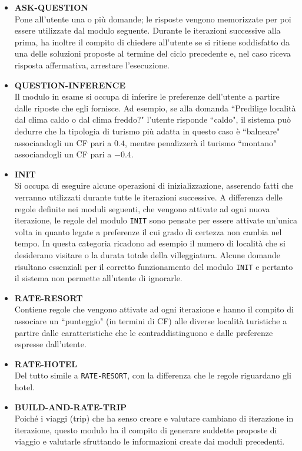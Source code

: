\begin{itemize}
\item \textbf{ASK-QUESTION}\\
Pone all'utente una o più domande; le risposte vengono memorizzate per poi essere utilizzate dal modulo seguente.  Durante le iterazioni successive alla prima, ha inoltre il compito di chiedere all'utente se si ritiene soddisfatto da una delle soluzioni proposte al termine del ciclo precedente e, nel caso riceva risposta affermativa, arrestare l'esecuzione.
\item \textbf{QUESTION-INFERENCE}\\
Il modulo in esame si occupa di inferire le preferenze dell'utente a partire dalle riposte che egli fornisce. Ad esempio, se alla domanda ``Predilige località dal clima caldo o dal clima freddo?" l'utente risponde ``caldo", il sistema può dedurre che la tipologia di turismo più adatta in questo caso è ``balneare" associandogli un CF pari a $0.4$, mentre penalizzerà il turismo ``montano" associandogli un CF pari a $-0.4$.
\item \textbf{INIT}\\
Si occupa di eseguire alcune operazioni di inizializzazione, asserendo fatti che verranno utilizzati durante tutte le iterazioni successive. A differenza delle regole definite nei moduli seguenti, che vengono attivate ad ogni nuova iterazione, le regole del modulo \texttt{INIT} sono pensate per essere attivate un'unica volta in quanto legate a preferenze il cui grado di certezza non cambia nel tempo. In questa categoria ricadono ad esempio il numero di località che si desiderano visitare o la durata totale della villeggiatura. Alcune domande risultano essenziali per il corretto funzionamento del modulo \texttt{INIT} e pertanto il sistema non permette all'utente di ignorarle. 
\item \textbf{RATE-RESORT}\\
Contiene regole che vengono attivate ad ogni iterazione e hanno il compito di associare un ``punteggio" (in termini di CF) alle diverse località turistiche a partire dalle caratteristiche che le contraddistinguono e dalle preferenze espresse dall'utente.
\item \textbf{RATE-HOTEL}\\
Del tutto simile a \texttt{RATE-RESORT}, con la differenza che le regole riguardano gli hotel.
\item \textbf{BUILD-AND-RATE-TRIP}\\
Poiché i viaggi (trip) che ha senso creare e valutare cambiano di iterazione in iterazione, questo modulo ha il compito di generare suddette proposte di viaggio e valutarle sfruttando le informazioni create dai moduli precedenti. 

\end{itemize}
